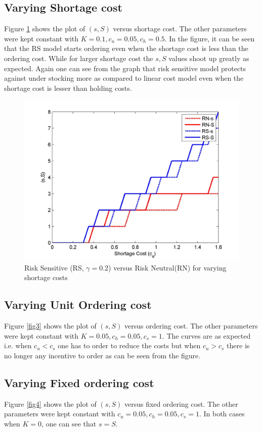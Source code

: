 \documentclass[11pt,a4paper,oneside]{report}
\begin{document}
\subsection{Varying Shortage cost}
Figure \ref{fig2} shows the plot of $(s,S)$ versus shortage cost. The other parameters were kept constant with $K=0.1, c_u=0.05, c_h=0.5$. In the figure,  it can be seen that the RS model starts ordering even when the shortage cost is less than the ordering cost. While for larger shortage cost the $s, S$ values shoot up greatly as expected. Again one can see from the graph that risk sensitive model protects against under stocking more as compared to linear cost model even when the shortage cost is lesser than holding costs. 
\begin{figure}[H]
\centering
\includegraphics[scale=0.15]{RS0_2vsRNsc}
\caption{Risk Sensitive (RS, $\gamma = 0.2$) versus Risk Neutral(RN) for varying shortage costs}
\label{fig2}
\end{figure}
\subsection{Varying Unit Ordering cost}
Figure \ref{fig3} shows the plot of $(s,S)$ versus ordering cost. The other parameters were kept constant with $K=0.05, c_h=0.05, c_s=1$. The curves are as expected i.e. when $c_u<c_s$ one has to order to reduce the costs but when $c_u>c_s$ there is no longer any incentive to order as can be seen from the figure.
\subsection{Varying Fixed ordering cost}
Figure \ref{fig4} shows the plot of $(s,S)$ versus fixed ordering cost. The other parameters were kept constant with $c_u=0.05, c_h=0.05, c_s=1$. In both cases when $K = 0$, one can see that $s = S$. 
\end{document}
